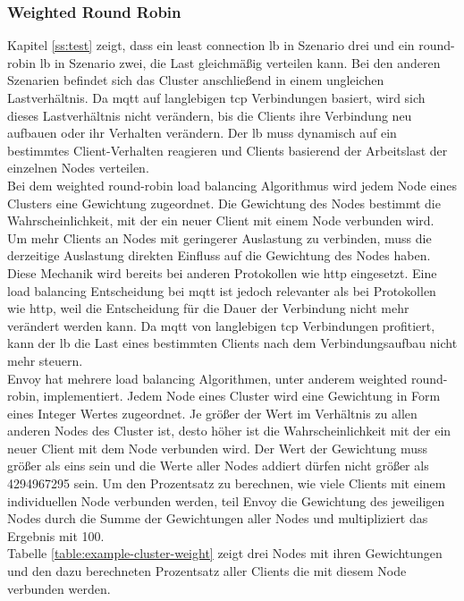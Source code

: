 \subsubsection{Weighted Round Robin} \label{ss:weighted-rr}
Kapitel \ref{ss:test} zeigt, dass ein least connection \acl{lb} in Szenario drei und ein round-robin \ac{lb} in Szenario zwei, die Last gleichmä{\ss}ig verteilen kann. Bei den anderen Szenarien befindet sich das Cluster anschlie{\ss}end in einem ungleichen Lastverhältnis. Da \ac{mqtt} auf langlebigen \ac{tcp} Verbindungen basiert, wird sich dieses Lastverhältnis nicht verändern, bis die Clients ihre Verbindung neu aufbauen oder ihr Verhalten verändern.
Der \ac{lb} muss dynamisch auf ein bestimmtes Client-Verhalten reagieren und Clients basierend der Arbeitslast der einzelnen Nodes verteilen.
\\
Bei dem weighted round-robin load balancing Algorithmus wird jedem Node eines Clusters eine Gewichtung zugeordnet. Die Gewichtung des Nodes bestimmt die Wahrscheinlichkeit, mit der ein neuer Client mit einem Node verbunden wird.
Um mehr Clients an Nodes mit geringerer Auslastung zu verbinden, muss die derzeitige Auslastung direkten Einfluss auf die Gewichtung des Nodes haben.
Diese Mechanik wird bereits bei anderen Protokollen wie \ac{http} eingesetzt.
Eine load balancing Entscheidung bei \ac{mqtt} ist jedoch relevanter als bei Protokollen wie \ac{http}, weil die Entscheidung für die Dauer der Verbindung nicht mehr verändert werden kann. Da \ac{mqtt} von langlebigen \ac{tcp} Verbindungen profitiert, kann der \ac{lb} die Last eines bestimmten Clients nach dem Verbindungsaufbau nicht mehr steuern.
\\
Envoy hat mehrere load balancing Algorithmen, unter anderem weighted round-robin, implementiert. Jedem Node eines Cluster wird eine Gewichtung in Form eines Integer Wertes zugeordnet. Je grö{\ss}er der Wert im Verhältnis zu allen anderen Nodes des Cluster ist, desto höher ist die Wahrscheinlichkeit mit der ein neuer Client mit dem Node verbunden wird. Der Wert der Gewichtung muss grö{\ss}er als eins sein und die Werte aller Nodes addiert dürfen nicht grö{\ss}er als 4294967295 sein.
Um den Prozentsatz zu berechnen, wie viele Clients mit einem individuellen Node verbunden werden, teil Envoy die Gewichtung des jeweiligen Nodes durch die Summe der Gewichtungen aller Nodes und multipliziert das Ergebnis mit 100.
\cite{SupportedLoadBalancers}
\\
Tabelle \ref{table:example-cluster-weight} zeigt drei Nodes mit ihren Gewichtungen und den dazu berechneten Prozentsatz aller Clients die mit diesem Node verbunden werden.
